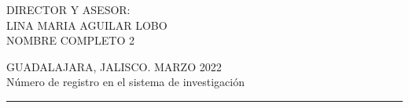 \begin{titlepage}
\begin{center}
        {\scriptsize DIRECTOR Y ASESOR:\\ LINA MARIA AGUILAR LOBO \\ NOMBRE COMPLETO 2}
        
        \vfill
        
        {\scriptsize GUADALAJARA, JALISCO. MARZO 2022 \\ Número de registro en el sistema de investigación}
        \rule{\textwidth}{4pt}\vspace*{-\baselineskip}\vspace*{2pt} %
    \end{center}
\end{titlepage}